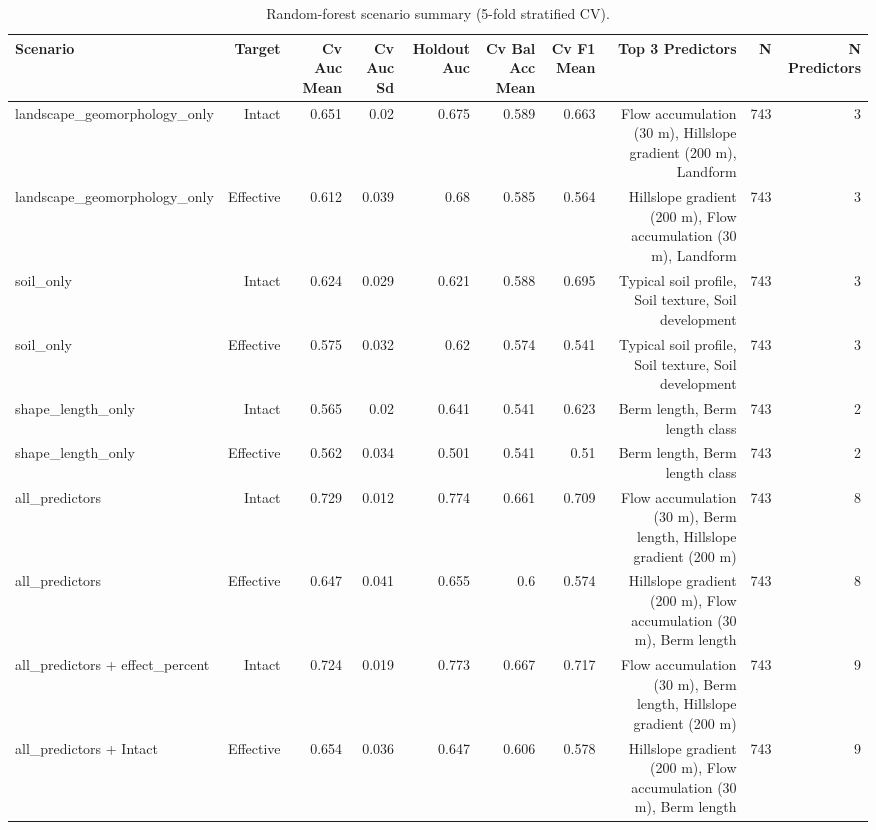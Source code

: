 \documentclass[11pt, a4paper]{article}
\begin{document}
\begin{table}[H]
  \centering
  \caption{Random-forest scenario summary (5-fold stratified CV).}
  \label{tab:si_scenario_summary}
  \small
  \begin{tabular}{lrrrrrrrrr}
    \toprule
    Scenario & Target & Cv Auc Mean & Cv Auc Sd & Holdout Auc & Cv Bal Acc Mean & Cv F1 Mean & Top 3 Predictors & N & N Predictors \\
    \midrule
    landscape_geomorphology_only & Intact & 0.651 & 0.02 & 0.675 & 0.589 & 0.663 & Flow accumulation (30 m), Hillslope gradient (200 m), Landform & 743 & 3 \\
    landscape_geomorphology_only & Effective & 0.612 & 0.039 & 0.68 & 0.585 & 0.564 & Hillslope gradient (200 m), Flow accumulation (30 m), Landform & 743 & 3 \\
    soil_only & Intact & 0.624 & 0.029 & 0.621 & 0.588 & 0.695 & Typical soil profile, Soil texture, Soil development & 743 & 3 \\
    soil_only & Effective & 0.575 & 0.032 & 0.62 & 0.574 & 0.541 & Typical soil profile, Soil texture, Soil development & 743 & 3 \\
    shape_length_only & Intact & 0.565 & 0.02 & 0.641 & 0.541 & 0.623 & Berm length, Berm length class & 743 & 2 \\
    shape_length_only & Effective & 0.562 & 0.034 & 0.501 & 0.541 & 0.51 & Berm length, Berm length class & 743 & 2 \\
    all_predictors & Intact & 0.729 & 0.012 & 0.774 & 0.661 & 0.709 & Flow accumulation (30 m), Berm length, Hillslope gradient (200 m) & 743 & 8 \\
    all_predictors & Effective & 0.647 & 0.041 & 0.655 & 0.6 & 0.574 & Hillslope gradient (200 m), Flow accumulation (30 m), Berm length & 743 & 8 \\
    all_predictors + effect_percent & Intact & 0.724 & 0.019 & 0.773 & 0.667 & 0.717 & Flow accumulation (30 m), Berm length, Hillslope gradient (200 m) & 743 & 9 \\
    all_predictors + Intact & Effective & 0.654 & 0.036 & 0.647 & 0.606 & 0.578 & Hillslope gradient (200 m), Flow accumulation (30 m), Berm length & 743 & 9 \\
    \bottomrule
  \end{tabular}
\end{table}

\vspace{2em}
\end{document}
